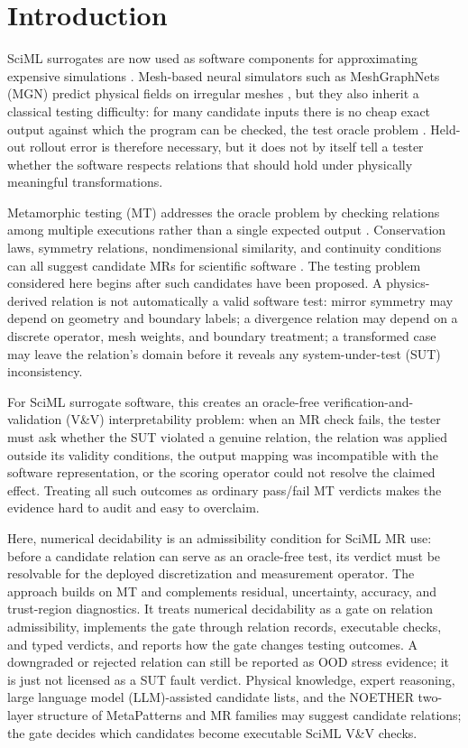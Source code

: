 \documentclass[preprint,12pt,authoryear]{elsarticle}
\begin{document}
\section{Introduction}
\label{sec:introduction}

SciML surrogates are now used as software components for approximating expensive simulations \citep{raissi2019pinn,karniadakis2021piml,li2021fno}. Mesh-based neural simulators such as MeshGraphNets (MGN) predict physical fields on irregular meshes \citep{pfaff2021meshgraphnets}, but they also inherit a classical testing difficulty: for many candidate inputs there is no cheap exact output against which the program can be checked, the test oracle problem \citep{barr2015oracle}. Held-out rollout error is therefore necessary, but it does not by itself tell a tester whether the software respects relations that should hold under physically meaningful transformations.

Metamorphic testing (MT) addresses the oracle problem by checking relations among multiple executions rather than a single expected output \citep{chen1998metamorphic,segura2016survey}. Conservation laws, symmetry relations, nondimensional similarity, and continuity conditions can all suggest candidate MRs for scientific software \citep{kanewala2019scientific,lin2020exploratory,olsen2019simulation}. The testing problem considered here begins after such candidates have been proposed. A physics-derived relation is not automatically a valid software test: mirror symmetry may depend on geometry and boundary labels; a divergence relation may depend on a discrete operator, mesh weights, and boundary treatment; a transformed case may leave the relation's domain before it reveals any system-under-test (SUT) inconsistency.

For SciML surrogate software, this creates an oracle-free verification-and-validation (V\&V) interpretability problem: when an MR check fails, the tester must ask whether the SUT violated a genuine relation, the relation was applied outside its validity conditions, the output mapping was incompatible with the software representation, or the scoring operator could not resolve the claimed effect. Treating all such outcomes as ordinary pass/fail MT verdicts makes the evidence hard to audit and easy to overclaim.

Here, numerical decidability is an admissibility condition for SciML MR use: before a candidate relation can serve as an oracle-free test, its verdict must be resolvable for the deployed discretization and measurement operator. The approach builds on MT and complements residual, uncertainty, accuracy, and trust-region diagnostics. It treats numerical decidability as a gate on relation admissibility, implements the gate through relation records, executable checks, and typed verdicts, and reports how the gate changes testing outcomes. A downgraded or rejected relation can still be reported as OOD stress evidence; it is just not licensed as a SUT fault verdict. Physical knowledge, expert reasoning, large language model (LLM)-assisted candidate lists, and the NOETHER two-layer structure of MetaPatterns and MR families \citep{zhao2026noether} may suggest candidate relations; the gate decides which candidates become executable SciML V\&V checks.
\end{document}
